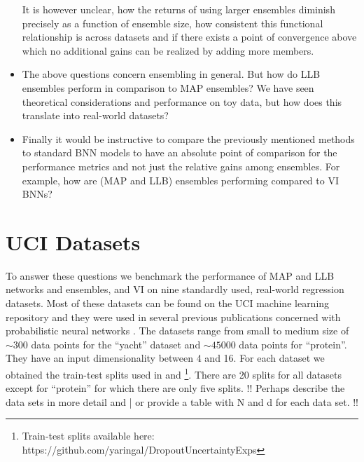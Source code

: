 \documentclass[../thesis.tex]{subfiles}
\begin{document}
\begin{itemize}
    It is however unclear, how the returns of using larger ensembles diminish precisely as a function of ensemble size, how consistent this functional relationship is across datasets and if there exists a point of convergence above which no additional gains can be realized by adding more members.
    \item The above questions concern ensembling in general. But how do LLB ensembles perform in comparison to MAP ensembles? We have seen theoretical considerations and performance on toy data, but how does this translate into real-world datasets?
    \item Finally it would be instructive to compare the previously mentioned methods to standard BNN models to have an absolute point of comparison for the performance metrics and not just the relative gains among ensembles. For example, how are (MAP and LLB) ensembles performing compared to VI BNNs?
\end{itemize}


\section{UCI Datasets}
To answer these questions we benchmark the performance of MAP and LLB networks and ensembles, and VI on nine standardly used, real-world regression datasets. Most of these datasets can be found on the UCI machine learning repository \parencite{dua2017uci} and they were used in several previous publications concerned with probabilistic neural networks \parencite{hernandez2015probabilistic, gal2016dropout, lakshminarayanan2017simple, ghosh2018structured, sun2019functional, ober2019benchmarking}. The datasets range from small to medium size of ${\sim}300$ data points for the ``yacht'' dataset and ${\sim}45000$ data points for ``protein''. They have an input dimensionality between 4 and 16. For each dataset we obtained the train-test splits used in \textcite{gal2016dropout} and \textcite{hernandez2015probabilistic}\footnote{Train-test splits available here: https://github.com/yaringal/DropoutUncertaintyExps}. There are 20 splits for all datasets except for ``protein'' for which there are only five splits. !! Perhaps describe the data sets in more detail and | or provide a table with N and d for each data set. !! 
\end{document}
